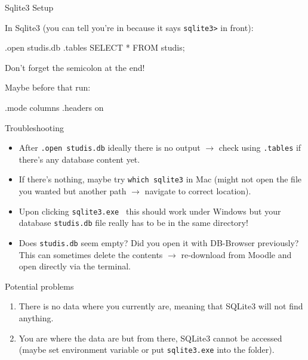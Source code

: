 \begin{frame}{Sqlite3 Setup}
\framebreak

In Sqlite3 (you can tell you're in because it says \texttt{sqlite3>} in front):
\begin{sqlcode}
.open studis.db
.tables
SELECT * FROM studis;
\end{sqlcode}
Don't forget the semicolon at the end!

Maybe before that run:
\begin{sqlcode}
.mode columns
.headers on
\end{sqlcode}

\framebreak

\begin{block}{Troubleshooting}
\begin{itemize}\small
    \item After \texttt{.open studis.db} ideally there is no output $\to$ check using \texttt{.tables} if there's any database content yet. 
    \item If there's nothing, maybe try \texttt{which sqlite3} in Mac (might not open the file you wanted but another path $\to$ navigate to correct location). 
    \item Upon clicking \texttt{sqlite3.exe } this should work under Windows but your database \texttt{studis.db} file really has to be in the same directory!
    \item Does \texttt{studis.db} seem empty? Did you open it with DB-Browser previously? This can sometimes delete the contents $\to$ re-download from Moodle and open directly via the terminal. 
\end{itemize}
\end{block}

\framebreak

\begin{block}{Potential problems}
\begin{enumerate}\small
    \item There is no data where you currently are, meaning that SQLite3 will not find anything. 
    \item You are where the data are but from there, SQLite3 cannot be accessed (maybe set environment variable or put \texttt{sqlite3.exe} into the folder). 
\end{enumerate}
\end{block}

\end{frame}


